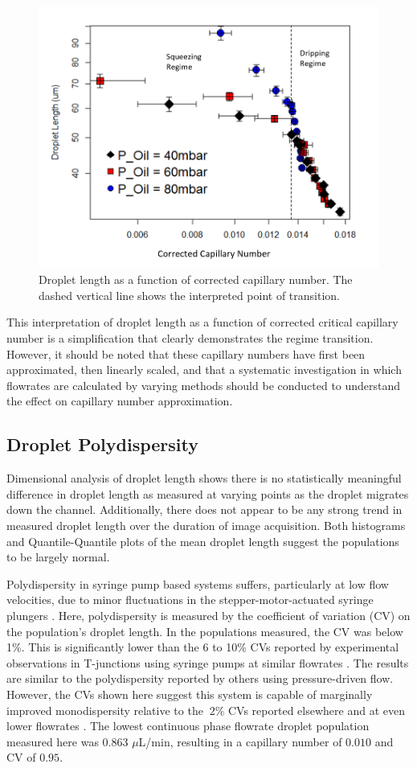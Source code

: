 \begin{figure}[H]
\centering 
\includegraphics[width=0.750\columnwidth]{ca_cor.PNG} 
\caption[Droplet Length as a function of Corrected Capillary Number]{Droplet length as a function of corrected capillary number. The dashed vertical line shows the interpreted point of transition.} 
\label{fig:ca_cor} 
\end{figure}

This interpretation of droplet length as a function of corrected critical capillary number is a simplification that clearly demonstrates the regime transition. However, it should be noted that these capillary numbers have first been approximated, then linearly scaled, and that a systematic investigation in which flowrates are calculated by varying methods should be conducted to understand the effect on capillary number approximation.
\clearpage

\subsection{Droplet Polydispersity}

Dimensional analysis of droplet length shows there is no statistically meaningful difference in droplet length as measured at varying points as the droplet migrates down the channel. Additionally, there does not appear to be any strong trend in measured droplet length over the duration of image acquisition. Both histograms and Quantile-Quantile plots of the mean droplet length suggest the populations to be largely normal. 

Polydispersity in syringe pump based systems suffers, particularly at low flow velocities, due to minor fluctuations in the stepper-motor-actuated syringe plungers \cite{Christopher2008}. Here, polydispersity is measured by the coefficient of variation (CV) on the population’s droplet length. In the populations measured, the CV was below 1\%. This is significantly lower than the 6 to 10\% CVs reported by experimental observations in T-junctions using syringe pumps at similar flowrates \cite{Christopher2008}. The results are similar to the polydispersity reported by others using pressure-driven flow. However, the CVs shown here suggest this system is capable of marginally improved monodispersity relative to the $~2\%$ CVs reported elsewhere and at even lower flowrates \cite{Kaminski2016, Lim2015}. The lowest continuous phase flowrate droplet population measured here was 0.863 $\mu $L/min, resulting in a capillary number of $0.010$ and CV of $0.95$.


